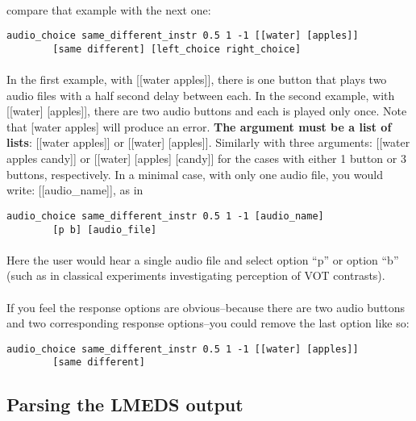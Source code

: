 \paragraph{}
compare that example with the next one:

\begin{lstlisting}
audio_choice same_different_instr 0.5 1 -1 [[water] [apples]]
		[same different] [left_choice right_choice]
\end{lstlisting}

\paragraph{}
In the first example, with [[water apples]], there is one button that plays two audio files with a half second delay between each.  In the second example, with [[water] [apples]], there are two audio buttons and each is played only once.  Note that [water apples] will produce an error.  \textbf{The argument must be a list of lists}: [[water apples]] or [[water] [apples]].  Similarly with three arguments: [[water apples candy]] or [[water] [apples] [candy]] for the cases with either 1 button or 3 buttons, respectively.  In a minimal case, with only one audio file, you would write: [[audio\_name]], as in 

\begin{lstlisting}
audio_choice same_different_instr 0.5 1 -1 [audio_name]
		[p b] [audio_file]
\end{lstlisting}

\paragraph{}
Here the user would hear a single audio file and select option ``p'' or option ``b'' (such as in classical experiments investigating perception of VOT contrasts).

\paragraph{}
If you feel the response options are obvious--because there are two audio buttons and two corresponding response options--you could remove the last option like so:
\begin{lstlisting}
audio_choice same_different_instr 0.5 1 -1 [[water] [apples]]
		[same different]
\end{lstlisting}


\subsection{Parsing the LMEDS output}

